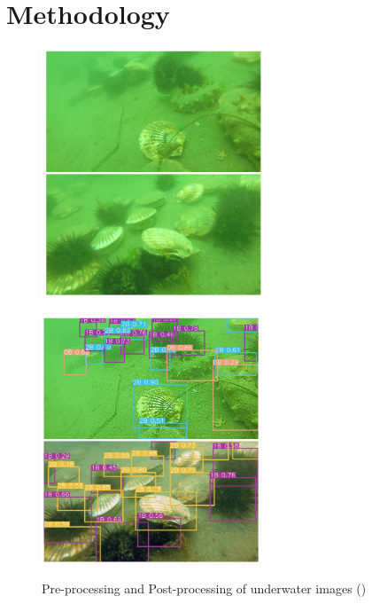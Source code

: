 \section{Methodology}

\begin{figure}[tb]
    \begin{minipage}{0.48\textwidth}
      \centering
      \includegraphics[width=.7\linewidth]{figures/pre-processing.png}
      \label{Fig:PreProcessing}
    \end{minipage}\hfill
    \begin{minipage}{0.48\textwidth}
      \centering
      \includegraphics[width=.7\linewidth]{figures/post-processing.png}
      \label{Fig:PostProcessing}
    \end{minipage}
    \caption{Pre-processing and Post-processing of underwater images (\cite{jiangUnderwaterSpeciesDetection2021})}
\end{figure}

